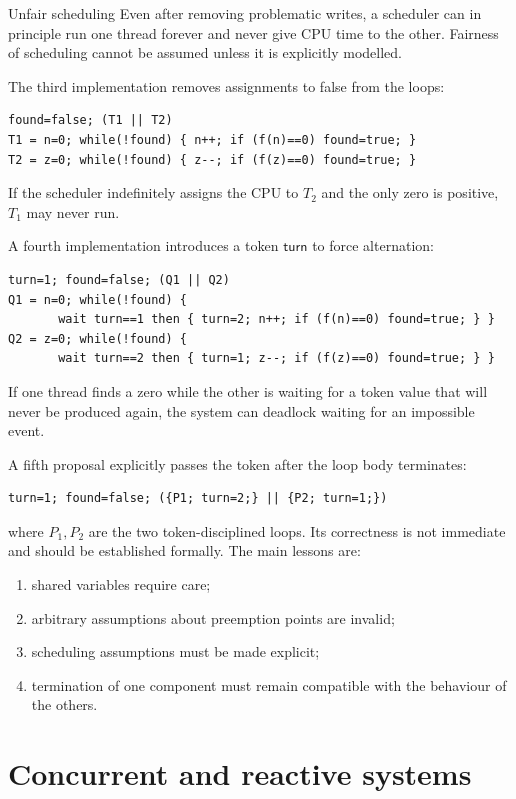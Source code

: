 \documentclass[a4paper]{article}
\begin{document}
\begin{snippetexample}{Unfair scheduling}
    Even after removing problematic writes, a scheduler can in principle run one thread forever and never give CPU time to the other.
    Fairness of scheduling cannot be assumed unless it is explicitly modelled.
\end{snippetexample}

The third implementation removes assignments to false from the loops:
\begin{verbatim}
found=false; (T1 || T2)
T1 = n=0; while(!found) { n++; if (f(n)==0) found=true; }
T2 = z=0; while(!found) { z--; if (f(z)==0) found=true; }
\end{verbatim}
If the scheduler indefinitely assigns the CPU to \(T_2\) and the only zero is positive, \(T_1\) may never run.

A fourth implementation introduces a token \(\mathsf{turn}\) to force alternation:
\begin{verbatim}
turn=1; found=false; (Q1 || Q2)
Q1 = n=0; while(!found) {
       wait turn==1 then { turn=2; n++; if (f(n)==0) found=true; } }
Q2 = z=0; while(!found) {
       wait turn==2 then { turn=1; z--; if (f(z)==0) found=true; } }
\end{verbatim}
If one thread finds a zero while the other is waiting for a token value that will never be produced again, the system can deadlock waiting for an impossible event.

A fifth proposal explicitly passes the token after the loop body terminates:
\begin{verbatim}
turn=1; found=false; ({P1; turn=2;} || {P2; turn=1;})
\end{verbatim}
where \(P_1,P_2\) are the two token-disciplined loops.
Its correctness is not immediate and should be established formally.
The main lessons are:
\begin{enumerate}
    \item shared variables require care;
    \item arbitrary assumptions about preemption points are invalid;
    \item scheduling assumptions must be made explicit;
    \item termination of one component must remain compatible with the behaviour of the others.
\end{enumerate}

\section{Concurrent and reactive systems}
\end{document}
